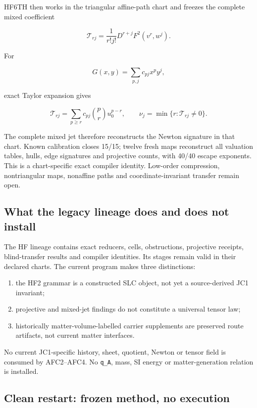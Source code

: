 HF6TH then works in the triangular affine-path chart and freezes the
complete mixed coefficient

\[
\mathcal T_{rj}
=\frac1{r!j!}D^{r+j}F^2(v^r,w^j).
\]

For

\[
G(x,y)=\sum_{p,j}c_{pj}x^py^j,
\]

exact Taylor expansion gives

\[
\mathcal T_{rj}
=\sum_{p\ge r}c_{pj}\binom pr u_0^{p-r},
\qquad
\nu_j=\min\{r:\mathcal T_{rj}\ne0\}.
\]

The complete mixed jet therefore reconstructs the Newton signature in
that chart. Known calibration closes 15/15; twelve fresh maps
reconstruct all valuation tables, hulls, edge signatures and projective
counts, with 40/40 escape exponents. This is a chart-specific exact
compiler identity. Low-order compression, nontriangular maps, nonaffine
paths and coordinate-invariant transfer remain open.

\subsection{What the legacy lineage does and does not
install}\label{viii-ch11-what-the-legacy-lineage-does-and-does-not-install}

The HF lineage contains exact reducers, cells, obstructions, projective
receipts, blind-transfer results and compiler identities. Its stages
remain valid in their declared charts. The current program makes three
distinctions:

\begin{enumerate}
\def\labelenumi{\arabic{enumi}.}
\tightlist
\item
  the HF2 grammar is a constructed SLC object, not yet a source-derived
  JC1 invariant;
\item
  projective and mixed-jet findings do not constitute a universal tensor
  law;
\item
  historically matter-volume-labelled carrier supplements are preserved
  route artifacts, not current matter interfaces.
\end{enumerate}

No current JC1-specific history, sheet, quotient, Newton or tensor field
is consumed by AFC2--AFC4. No \texttt{q\_A}, mass, SI energy or
matter-generation relation is installed.

\subsection{Clean restart: frozen method, no
execution}\label{viii-ch11-clean-restart-frozen-method-no-execution}

